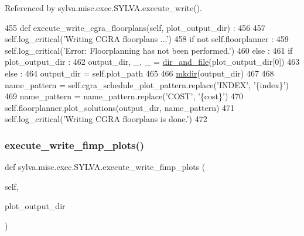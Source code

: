 Referenced by sylva.\+misc.\+exec.\+S\+Y\+L\+V\+A.\+execute\+\_\+write().


\begin{DoxyCode}
455   \textcolor{keyword}{def }execute\_write\_cgra\_floorplans(self, plot\_output\_dir) :
456 
457     self.log\_critical(\textcolor{stringliteral}{'Writing CGRA floorplans ...'})
458     \textcolor{keywordflow}{if} \textcolor{keywordflow}{not} self.floorplanner :
459       self.log\_critical(\textcolor{stringliteral}{'Error: Floorplanning has not been performed.'})
460     \textcolor{keywordflow}{else} :
461       \textcolor{keywordflow}{if} plot\_output\_dir :
462         output\_dir, \_, \_ = \hyperlink{namespacesylva_1_1misc_1_1util_a0ce6d1d719234031353b60ac60f2af0d}{dir\_and\_file}(plot\_output\_dir[0])
463       \textcolor{keywordflow}{else} :
464         output\_dir = self.plot\_path
465 
466       \hyperlink{namespacesylva_1_1misc_1_1util_af426e429c40209bbb46e3a0e8f139a44}{mkdir}(output\_dir)
467 
468       name\_pattern = self.cgra\_schedule\_plot\_pattern.replace(\textcolor{stringliteral}{'INDEX'}, \textcolor{stringliteral}{'\{index\}'})
469       name\_pattern = name\_pattern.replace(\textcolor{stringliteral}{'COST'}, \textcolor{stringliteral}{'\{cost\}'})
470       self.floorplanner.plot\_solutions(output\_dir, name\_pattern)
471       self.log\_critical(\textcolor{stringliteral}{'Writing CGRA floorplans is done.'})
472 
\end{DoxyCode}
\mbox{\label{classsylva_1_1misc_1_1exec_1_1_s_y_l_v_a_a3e0247fc0ddb86e4670ceaa082950e4d}} 
\subsubsection{\texorpdfstring{execute\+\_\+write\+\_\+fimp\+\_\+plots()}{execute\_write\_fimp\_plots()}}
{\footnotesize\ttfamily def sylva.\+misc.\+exec.\+S\+Y\+L\+V\+A.\+execute\+\_\+write\+\_\+fimp\+\_\+plots (\begin{DoxyParamCaption}\item[{}]{self,  }\item[{}]{plot\+\_\+output\+\_\+dir }\end{DoxyParamCaption})}



